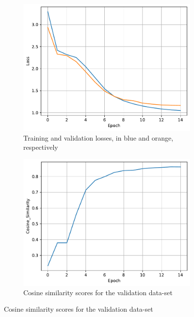 \documentclass[11pt]{article}
\begin{document}
\begin{figure}[H]
    \hspace{0.025\linewidth}
    \begin{subfigure}{0.45\linewidth}
        \centering
        \includegraphics[width=\linewidth]{../data/q3/2/loss__train_val.pdf}
        \caption{Training and validation losses, in blue and orange, respectively}
    \end{subfigure}
    \hspace{0.05\linewidth}
    \begin{subfigure}{0.45\linewidth}
        \centering
        \includegraphics[width=\linewidth]{../data/q3/2/cosine_similarity__val.pdf}
        \caption{Cosine similarity scores for the validation data-set}
    \end{subfigure}


\end{figure}
\end{document}
